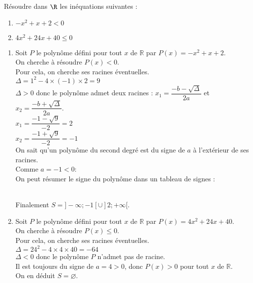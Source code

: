 \documentclass[a4paper,11pt,exos]{nsi} %
\begin{document}



\maketitle

\begin{exercice}
    Résoudre dans $\R$ les inéquations suivantes :
    \begin{multicols}{2}
        \begin{enumerate}
            \item $-x^2+x+2< 0$
	        \item $4x^2+24x+40\leqslant 0$
        \end{enumerate}
    \end{multicols}
    
\end{exercice}


\begin{enumerate}
    \item Soit $P$ le polynôme défini pour tout $x$ de $\mathbb R$ par $P(x)=-x^2+x+2$.\\On cherche à résoudre $P(x)< 0$.\\Pour cela, on cherche ses racines éventuelles.\\$\Delta = 1^2-4\times(-1)\times2=9$\\$\Delta>0$ donc le polynôme admet deux racines : $x_1 = \dfrac{-b-\sqrt{\Delta}}{2a}$ et $x_2 = \dfrac{-b+\sqrt{\Delta}}{2a}$.\\$x_1 =\dfrac{-1-\sqrt{9}}{-2}=2$\\$x_2 =\dfrac{-1+\sqrt{9}}{-2}=-1$\\On sait qu'un polynôme du second degré est du signe de $a$ à l'extérieur de ses racines.\\Comme $a=-1<0 :$\\On peut résumer le signe du polynôme dans un tableau de signes :\\
    \\

    Finalement $S=]-\infty;-1[\cup]2;+\infty[$.

    \item Soit $P$ le polynôme défini pour tout $x$ de $\mathbb R$ par $P(x)=4x^2+24x+40$.\\On cherche à résoudre $P(x)\leqslant 0$.\\Pour cela, on cherche ses racines éventuelles.\\$\Delta = 24^2-4\times4\times40=-64$\\$\Delta<0$ donc le polynôme $P$ n'admet pas de racine.\\ Il est toujours du signe de $a=4>0$, donc $P(x)>0$ pour tout $x$ de $\mathbb{R}$.\\ On en déduit $S=\varnothing$.
    \end{enumerate}
\end{document}
